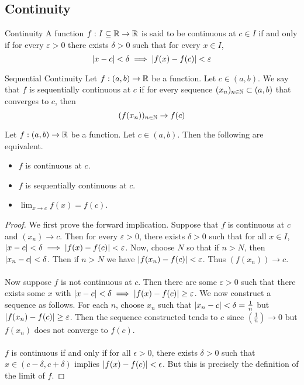 \documentclass[a4paper]{article}
\begin{document}
\subsection{Continuity}
\begin{defn}{Continuity}{} A function $f:I\subseteq\mathbb{R}\to\mathbb{R}$ is said to be continuous at $c\in I$ if and only if for every $\varepsilon>0$ there exists $\delta>0$ such that for every $x\in I$, $$\abs{x-c}<\delta\implies\abs{f(x)-f(c)}<\varepsilon$$
\end{defn}

\begin{defn}{Sequential Continuity}{} Let $f:(a,b)\to\mathbb{R}$ be a function. Let $c\in (a,b)$. We say that $f$ is sequentially continuous at $c$ if for every sequence $(x_n)_{n\in\mathbb{N}}\subset(a,b)$ that converges to $c$, then $$(f(x_n))_{n\in\mathbb{N}}\to f(c)$$
\end{defn}

\begin{thm}{}{} Let $f:(a,b)\to\mathbb{R}$ be a function. Let $c\in (a,b)$. Then the following are equivalent. 
\begin{itemize}
\item $f$ is continuous at $c$. 
\item $f$ is sequentially continuous at $c$. 
\item $\lim_{x\to c}f(x)=f(c)$. 
\end{itemize} \tcbline
\begin{proof} We first prove the forward implication. Suppose that $f$ is continuous at $c$ and $(x_n)\to c$. Then for every $\varepsilon>0$, there exists $\delta>0$ such that for all $x\in I$, $\abs{x-c}<\delta\implies\abs{f(x)-f(c)}<\varepsilon$. Now, choose $N$ so that if $n>N$, then $\abs{x_n-c}<\delta$. Then if $n>N$ we have $\abs{f(x_n)-f(c)}<\varepsilon$. Thus $\left(f(x_n)\right)\to c$. \\~\\
Now suppose $f$ is not continuous at $c$. Then there are some $\varepsilon>0$ such that there exists some $x$ with $\abs{x-c}<\delta\implies\abs{f(x)-f(c)}\geq\varepsilon$. We now construct a sequence as follows. For each $n$, choose $x_n$ such that $\abs{x_n-c}<\delta=\frac{1}{n}$ but $\abs{f(x_n)-f(c)}\geq\varepsilon$. Then the sequence constructed tends to $c$ since $\left(\frac{1}{n}\right)\to0$ but $f(x_n)$ does not converge to $f(c)$. \\~\\

$f$ is continuous if and only if for all $\epsilon>0$, there exists $\delta>0$ such that $x\in(c-\delta,c+\delta)$ implies $\abs{f(x)-f(c)}<\epsilon$. But this is precisely the definition of the limit of $f$. 
\end{proof}
\end{thm}
\end{document}

